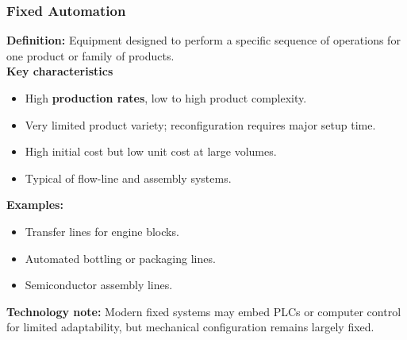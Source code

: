 \begin{frame}
	\frametitle{Fixed Automation}
  \textbf{Definition:}  
  Equipment designed to perform a specific sequence of operations for one product or family of products.\\
  \vspace{2mm}
  \textbf{Key characteristics}
  \begin{itemize}
    \item High \textbf{production rates}, low to high product complexity.
    \item Very limited product variety; reconfiguration requires major setup time.
    \item High initial cost but low unit cost at large volumes.
    \item Typical of flow-line and assembly systems.
  \end{itemize}
  \vspace{3mm}
  \textbf{Examples:}
  \begin{itemize}
    \item Transfer lines for engine blocks.
    \item Automated bottling or packaging lines.
    \item Semiconductor assembly lines.
  \end{itemize}
  \vspace{3mm}
  \textbf{Technology note:}  
  Modern fixed systems may embed PLCs or computer control for limited adaptability, but mechanical configuration remains largely fixed.
\end{frame}

